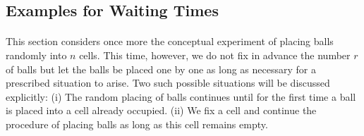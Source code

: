 \documentclass{article}
\numberwithin{equation}{subsection}
\begin{document}
		\subsection{Examples for Waiting Times}
			\paragraph{} This section considers once more the conceptual experiment of placing balls randomly into $n$ cells. This time, however, we do not fix in advance the number $r$ of balls but let the balls be placed one by one as long as necessary for a prescribed situation to arise. Two such possible situations will be discussed explicitly: (i) The random placing of balls continues until for the first time a ball is placed into a cell already occupied. (ii) We fix a cell and continue the procedure of placing balls as long as this cell remains empty.
\end{document}

